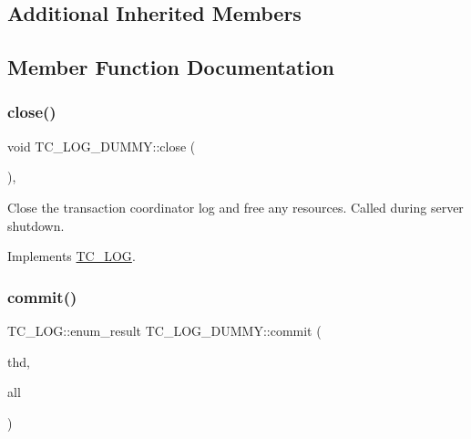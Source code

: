 \subsection*{Additional Inherited Members}


\subsection{Member Function Documentation}
\mbox{\label{classTC__LOG__DUMMY_adb7792f21f5a090a7d71a646d2ebf82f}} 
\subsubsection{\texorpdfstring{close()}{close()}}
{\footnotesize\ttfamily void T\+C\+\_\+\+L\+O\+G\+\_\+\+D\+U\+M\+M\+Y\+::close (\begin{DoxyParamCaption}{ }\end{DoxyParamCaption})\hspace{0.3cm}{\ttfamily [inline]}, {\ttfamily [virtual]}}

Close the transaction coordinator log and free any resources. Called during server shutdown. 

Implements \mbox{\hyperlink{classTC__LOG_a645b5d1b49c4c4396d327eef07e2dd53}{T\+C\+\_\+\+L\+OG}}.

\mbox{\label{classTC__LOG__DUMMY_acb87643d4017b6946c1f1814f8a4ca36}} 
\subsubsection{\texorpdfstring{commit()}{commit()}}
{\footnotesize\ttfamily T\+C\+\_\+\+L\+O\+G\+::enum\+\_\+result T\+C\+\_\+\+L\+O\+G\+\_\+\+D\+U\+M\+M\+Y\+::commit (\begin{DoxyParamCaption}\item[{T\+HD $\ast$}]{thd,  }\item[{bool}]{all }\end{DoxyParamCaption})\hspace{0.3cm}{\ttfamily [virtual]}}

